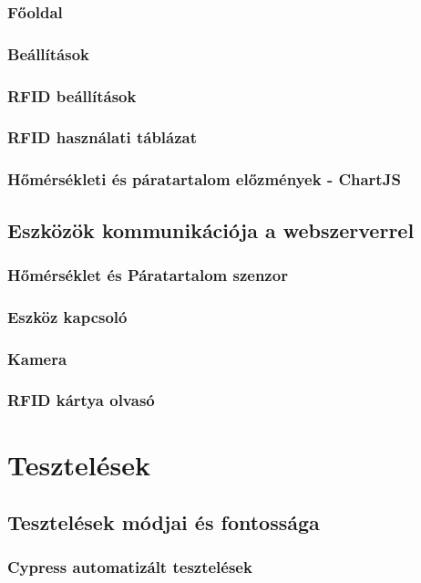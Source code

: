 \documentclass[
]{thesis-ekf}
\theoremstyle{definition}
\theoremstyle{remark}
\begin{document}
	\subsection{Főoldal}
	\subsection{Beállítások}
	\subsection{RFID beállítások}
	\subsection{RFID használati táblázat}
	\subsection{Hőmérsékleti és páratartalom előzmények - ChartJS}
	\section{Eszközök kommunikációja a webszerverrel}\label{csatlakozas-a-webszerverre}
	\subsection{Hőmérséklet és Páratartalom szenzor}
	\subsection{Eszköz kapcsoló}
	\subsection{Kamera}
	\subsection{RFID kártya olvasó}
	
	
	\chapter{Tesztelések}
	\section{Tesztelések módjai és fontossága}
	
	\subsection{Cypress automatizált tesztelések}
\end{document}
